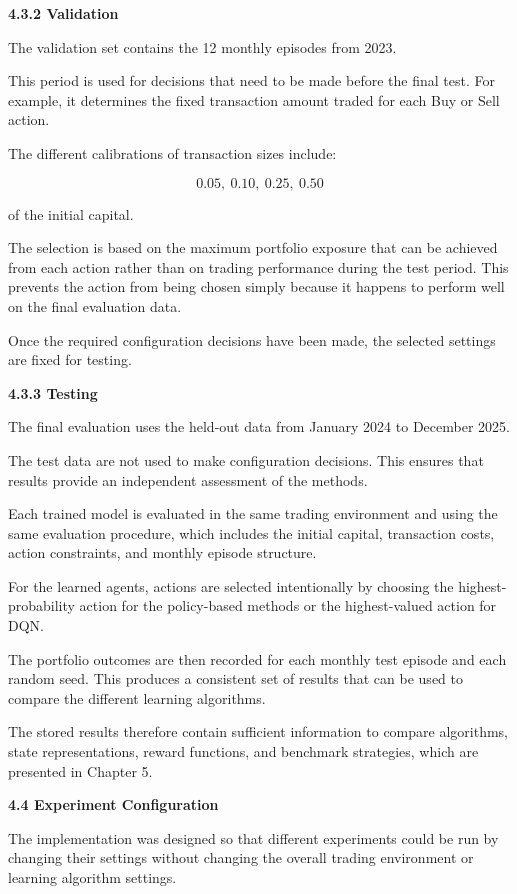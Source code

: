 \textbf{4.3.2 Validation}

The validation set contains the 12 monthly episodes from 2023.

This period is used for decisions that need to be made before the final
test. For example, it determines the fixed transaction amount traded for
each Buy or Sell action.

The different calibrations of transaction sizes include:

\[0.05,\ 0.10,\ 0.25,\ 0.50\]

of the initial capital.

The selection is based on the maximum portfolio exposure that can be
achieved from each action rather than on trading performance during the
test period. This prevents the action from being chosen simply because
it happens to perform well on the final evaluation data.

Once the required configuration decisions have been made, the selected
settings are fixed for testing.

\textbf{4.3.3 Testing}

The final evaluation uses the held-out data from January 2024 to
December 2025.

The test data are not used to make configuration decisions. This ensures
that results provide an independent assessment of the methods.

Each trained model is evaluated in the same trading environment and
using the same evaluation procedure, which includes the initial capital,
transaction costs, action constraints, and monthly episode structure.

For the learned agents, actions are selected intentionally by choosing
the highest-probability action for the policy-based methods or the
highest-valued action for DQN.

The portfolio outcomes are then recorded for each monthly test episode
and each random seed. This produces a consistent set of results that can
be used to compare the different learning algorithms.

The stored results therefore contain sufficient information to compare
algorithms, state representations, reward functions, and benchmark
strategies, which are presented in Chapter 5.

\textbf{4.4 Experiment Configuration}

The implementation was designed so that different experiments could be
run by changing their settings without changing the overall trading
environment or learning algorithm settings.

